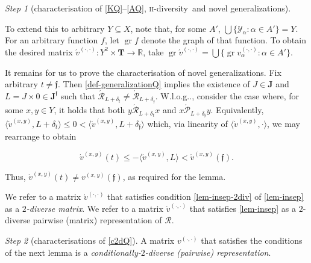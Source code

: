 \documentclass[ecta,nameyear,draft]{econsocart}
\makeatletter
\newcommand{\R}{\mathbb R}
\newcommand{\mc}{\mathcal}
\newcommand{\novel}{\mathfrak f}
\newcommand{\ext}{\mathrel{\mc R}}
\newcommand{\aext}{\mathrel{\acute{\mathrel{\mathcal R}}}}
\newcommand{\asext}{\mathrel{\acute{\mathrel{\mathcal P}}}}
\newcommand{\aextb}{\mathbin{\acute{\mathbin{\mathcal R}}}}
\newcommand{\mbbt}{{\mathbf {T}}}
\newcommand{\mbbj}{\mathbf J}
\newcommand{\mbbjp}{{\mathbf {J}^{\novel}}}
\newcommand{\xy}{{(x, y)}}
\newcommand{\dd}{{(\cdot,\cdot)}}
\newcommand{\twodiv}{\textsc{ii}-\textup{diversity}}
\DeclareMathOperator{\graph}{gr}
\newcommand\Wlog{W\@.l\@.o\@.g\@ifnextchar.{}{.\@}}
\theoremstyle{plain}
\theoremstyle{remark}
\newtheorem{step}{Step}[section]
\makeatother
\begin{document}
\begin{appendix}
\begin{step}[characterisation of \ref{KQ}–\ref{AQ}, \twodiv\ and novel
      generalizations]
\begin{proofEnd}
      To extend this to arbitrary $Y \subseteq X$, note that, for some $A'$,
      $\bigcup\{\mc Y_\alpha : \alpha \in A' \} = Y$. For an arbitrary function
      $f$, let $\graph f$ denote the graph of that function. To obtain the
      desired matrix $\acute{v}^{\dd}: Y^2 \times \mbbt \rightarrow \R$, take
      $\graph \acute{v}^{\dd} = \bigcup \{\graph v^{\dd}_{\alpha} : \alpha \in
      A'\}$.
    
      It remains for us to prove the characterisation of novel
      generalizations. Fix arbitrary $t \neq \novel$.  Then
      \cref{def-generalizationQ} implies the existence of $J \in \mbbj$ and $L
      = J \times 0 \in \mbbjp$ such that $\aextb _ {L + \delta_{t}} \neq \aextb
      _ {L + \delta_{\novel}}$.  \Wlog, consider the case where, for some $x ,
      y \in Y$, it holds that both $y \aext _ {L + \delta _ t} x$ and $x \asext
      _ {L + \delta_ \novel} y $. Equivalently, $\langle \acute{v}^{\xy}, L +
      \delta_ t \rangle \leq 0 < \langle \acute{v}^{\xy}, L + \delta_
      \novel\rangle$ which, via linearity of $\langle \acute{v}^{\xy}, \cdot
      \rangle$, we may rearrange to obtain
      \begin{linenomath*}
        \begin{equation}\label{eq-nov} \acute{v}^{\xy} ( t ) \leq -\langle
          \acute{v}^{\xy}, L \rangle <
          \acute{v}^\xy ( \novel ) .
        \end{equation}
      \end{linenomath*}
      Thus, $\acute{v}^{\xy} (t) \neq v^{\xy}(\novel)$, as required for the
      lemma.
    \end{proofEnd}
    We refer to a matrix $\acute{v}^{\dd}$ that satisfies condition
    \ref{lem-insep-2div} of \cref{lem-insep} as a \emph{$2$-diverse matrix}. We
    refer to a matrix $\acute{v}^{\dd}$ that satisfies \cref{lem-insep} as a
    $2$-diverse pairwise (matrix) representation of $\ext$.
  \end{step}
  \begin{step}[characterisations of \ref{c2dQ}]\label{step-ref{c2d}} A matrix
    $v^{\dd}$ that satisfies the conditions of the next lemma is a
    \emph{conditionally-$2$-diverse (pairwise) representation}.
  

\end{step}
\end{appendix}
\end{document}
